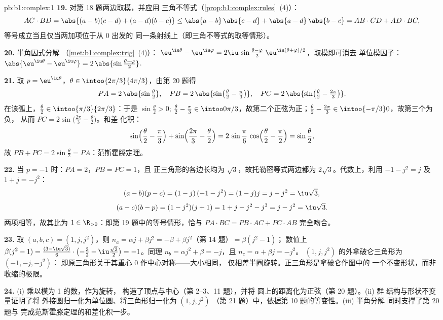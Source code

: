\begin{solution}{pb:b1:complex:1}
\textbf{19.} 对第 18 题两边取模，并应用
三角不等式（\cref{prop:b1:complex:rules}~(4)）：
\[
AC \cdot BD = \abs{(a-b)(c-d) + (a-d)(b-c)}
\leq \abs{a-b}\,\abs{c-d} + \abs{a-d}\,\abs{b-c}
= AB \cdot CD + AD \cdot BC ,
\]
等号成立当且仅当两加项位于从 $0$ 出发的
同一条射线上（即三角不等式的取等情形）。

\textbf{20.} 半角因式分解
（\cref{met:b1:complex:trig}~(4)）：
$\eu^{\iu\theta} - \eu^{\iu\varphi} = 2\iu\,\sin\frac{\theta -
\varphi}2\;\eu^{\iu(\theta + \varphi)/2}$，取模即可消去
单位模因子：$\abs{\eu^{\iu\theta} - \eu^{\iu\varphi}}
= 2\,\abs{\sin\frac{\theta - \varphi}2}$.

\textbf{21.} 取 $p = \eu^{\iu\theta}$，$\theta \in
\intoo{2\pi/3}{4\pi/3}$，由第 20 题得
\[
PA = 2\,\abs{\sin\tfrac\theta2},
\quad
PB = 2\,\abs{\sin\bigl(\tfrac\theta2 - \tfrac\pi3\bigr)},
\quad
PC = 2\,\abs{\sin\bigl(\tfrac\theta2 - \tfrac{2\pi}3\bigr)} .
\]
在该弧上，$\frac\theta2 \in \intoo{\pi/3}{2\pi/3}$：于是
$\sin\frac\theta2 > 0$; $\frac\theta2 - \frac\pi3 \in
\intoo0{\pi/3}$，故第二个正弦为正；$\frac\theta2 -
\frac{2\pi}3 \in \intoo{-\pi/3}0$，故第三个为负，
从而 $PC = 2\sin\bigl(\frac{2\pi}3 - \frac\theta2\bigr)$。和差
化积：
\[
\sin\Bigl(\frac\theta2 - \frac\pi3\Bigr) +
\sin\Bigl(\frac{2\pi}3 - \frac\theta2\Bigr)
= 2\,\sin\frac\pi6\,\cos\Bigl(\frac\theta2 - \frac\pi2\Bigr)
= \sin\frac\theta2 ,
\]
故 $PB + PC = 2\sin\frac\theta2 = PA$：范斯霍滕定理。

\textbf{22.} 当 $p = -1$ 时：$PA = 2$，$PB = PC = 1$，且
正三角形的各边长均为 $\sqrt3$，故托勒密等式两边都为
$2\sqrt3$。代数上，利用 $-1 - j^2 = j$ 及
$1 + j = -j^2$：
\[
(a - b)(p - c) = (1 - j)\,(-1 - j^2) = (1 - j)j = j - j^2
= \iu\sqrt3 ,
\]
\[
(a - c)(b - p) = (1 - j^2)(j + 1) = 1 + j - j^2 - j^3
= j - j^2 = \iu\sqrt3 .
\]
两项相等，故其比为
$1 \in \R_{>0}$：即第 19 题中的等号情形，恰与 $PA
\cdot BC = PB \cdot AC + PC \cdot AB$ 完全吻合。

\textbf{23.} 取 $(a, b, c) = (1, j, j^2)$，则 $n_a = \alpha j +
\beta j^2 = -\beta + \beta j^2$（第 14 题）$= \beta(j^2 - 1)$；
数值上 $\beta(j^2 - 1) = \frac{(3 - \iu\sqrt3)}6 \cdot
\bigl(-\frac32 - \iu\frac{\sqrt3}2\bigr) = -1$。同理 $n_b =
\alpha j^2 + \beta = -j$，且 $n_c = \alpha + \beta j = -j^2$。
$(1, j, j^2)$ 的外拿破仑三角形为 $(-1, -j, -j^2)$：
即原三角形关于其重心 $0$ 作中心对称——大小相同，
仅相差半圈旋转。正三角形是拿破仑作图中的
一个不变形状，而非收缩的极限。

\textbf{24.} (i) 乘以模为 1 的数，作为旋转，
构造了顶点与中心（第 2--3、11 题），并将
圆上的距离化为正弦（第 20 题）。(ii) 群
结构与形状不变量证明了将
外接圆归一化为单位圆、将三角形归一化为 $(1, j, j^2)$
（第 21 题）中，依据第 10 题的等变性。(iii) 半角分解
同时支撑了第 20 题与
完成范斯霍滕定理的和差化积一步。


\end{solution}
